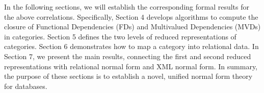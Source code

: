 In the following sections, we will establish the corresponding formal results for the above correlations. Specifically, Section 4 develops algorithms to compute the closure of Functional Dependencies (FDs) and Multivalued Dependencies (MVDs) in categories. Section 5 defines the two levels of reduced representations of categories. Section 6 demonstrates how to map a category into relational data. In Section 7, we present the main results, connecting the first and second reduced representations with relational normal form and XML normal form. In summary, the purpose of these sections is to establish a novel, unified normal form theory for databases.